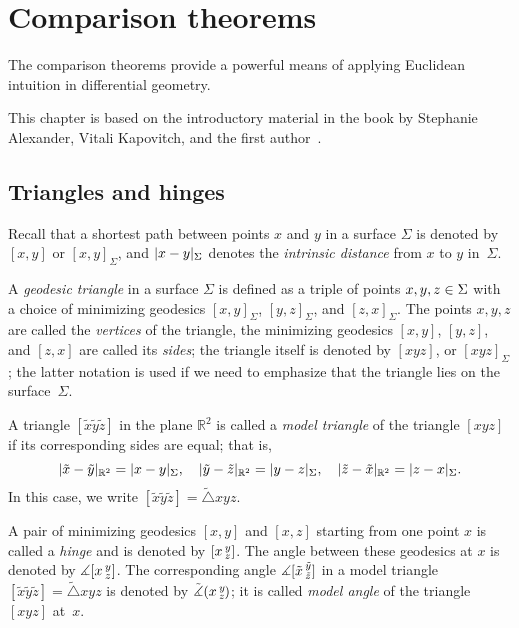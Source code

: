\chapter{Comparison theorems}
\label{chap:comparison}

The comparison theorems provide a powerful means of applying Euclidean intuition in differential geometry.

This chapter is based on the introductory material in the book by Stephanie Alexander, Vitali Kapovitch, and the first author~\cite{alexander-kapovitch-petrunin2027}.

\section{Triangles and hinges}

Recall that a shortest path between points $x$ and $y$ in a surface $\Sigma$ is denoted by $[x,y]$ or $[x,y]_\Sigma$, and
$\dist{x}{y}\Sigma$ denotes the \emph{intrinsic distance} from $x$ to $y$ in~$\Sigma$.

A \emph{geodesic triangle} in a surface $\Sigma$ is defined as a triple of points $x,y,z\z\in \Sigma$ with a choice of minimizing geodesics $[x,y]_\Sigma$, $[y,z]_\Sigma$, and $[z,x]_\Sigma$.
The points $x,y,z$ are called the {}\emph{vertices} of the triangle,
the minimizing geodesics $[x,y]$, $[y,z]$, and $[z,x]$ are called its {}\emph{sides};
the triangle itself is denoted by $[xyz]$, or $[xyz]_\Sigma$;
the latter notation is used if we need to emphasize that the triangle lies on the surface~$\Sigma$.

A triangle $[\tilde x\tilde y\tilde z]$ in the plane $\mathbb{R}^2$ is called a \emph{model triangle} of the triangle $[xyz]$
if its corresponding sides are equal;
that is,
\[\dist{\tilde x}{\tilde y}{\mathbb{R}^2}=\dist{x}{y}\Sigma,
\quad
\dist{\tilde y}{\tilde z}{\mathbb{R}^2}=\dist{y}{z}\Sigma,
\quad
\dist{\tilde z}{\tilde x}{\mathbb{R}^2}=\dist{z}{x}\Sigma.
\]
In this case, we write $[\tilde x\tilde y\tilde z]=\tilde\triangle xyz$.

A pair of minimizing geodesics $[x,y]$ and $[x,z]$ starting from one point $x$ is called a \emph{hinge} and is denoted by $[x\,{}^{y}_{z}]$.
The angle between these geodesics at $x$ is denoted by $\measuredangle[x\,{}^{y}_{z}]$.
The corresponding angle $\measuredangle[\tilde x\,{}^{\tilde y}_{\tilde z}]$ in a model triangle $[\tilde x\tilde y\tilde z]=\tilde\triangle xyz$ is denoted by $\tilde\measuredangle(x\,{}^{y}_{z}\hspace{-0.2ex})$;
it is called {}\emph{model angle} of the triangle $[xyz]$ at~$x$.

